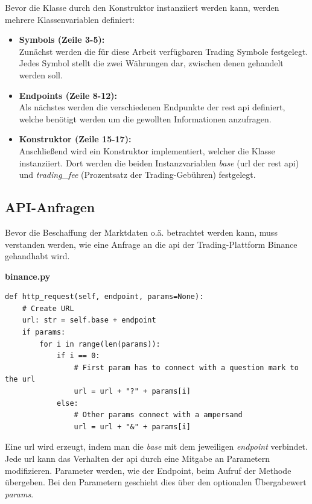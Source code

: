\documentclass[oneside]{ausarbeitung}
\begin{document}
Bevor die Klasse durch den Konstruktor instanziiert werden kann, werden mehrere Klassenvariablen definiert: \\
\begin{itemize}
	\item \textbf{Symbols (Zeile 3-5):} \\
		Zunächst werden die für diese Arbeit verfügbaren Trading Symbole
		festgelegt. Jedes Symbol stellt die zwei Währungen dar, zwischen denen
		gehandelt werden soll.
	\item \textbf{Endpoints (Zeile 8-12):} \\
		Als nächstes werden die verschiedenen Endpunkte der \ac{rest} \ac{api}
		definiert, welche benötigt werden um die gewollten Informationen
		anzufragen.
	\item \textbf{Konstruktor (Zeile 15-17):} \\
		Anschließend wird ein Konstruktor implementiert, welcher die Klasse 
		instanziiert. Dort werden die beiden Instanzvariablen \textit{base} 
		(\ac{url} der \ac{rest} \ac{api}) und \textit{trading\_fee} (Prozentsatz 
		der Trading-Gebühren) festgelegt. 	

\end{itemize}
\subsection{API-Anfragen}
\label{sub:api_anfragen}

Bevor die Beschaffung der Marktdaten o.ä. betrachtet werden kann, muss verstanden werden, wie eine Anfrage an die \ac{api} der Trading-Plattform Binance gehandhabt wird.

\lstset{language=Python}
\lstset{frame=lines}
\lstset{basicstyle=\footnotesize}
\textbf{binance.py}
\begin{lstlisting}
def http_request(self, endpoint, params=None):
	# Create URL
	url: str = self.base + endpoint
	if params:
		for i in range(len(params)):
			if i == 0:
				# First param has to connect with a question mark to the url
				url = url + "?" + params[i]
			else:
				# Other params connect with a ampersand
				url = url + "&" + params[i]
\end{lstlisting}

Eine \ac{url} wird erzeugt, indem man die \textit{base} mit dem jeweiligen \textit{endpoint} verbindet. Jede \ac{url} kann das Verhalten der \ac{api} durch eine Mitgabe an Parametern modifizieren. Parameter werden, wie der Endpoint, beim Aufruf der Methode übergeben. Bei den Parametern geschieht dies über den optionalen Übergabewert \textit{params}. 
\end{document}
